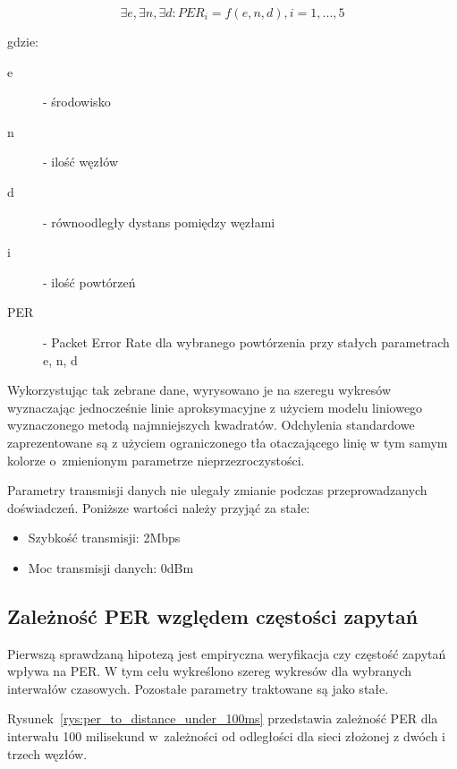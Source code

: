 \begin{equation}
\label{experiment_definition}
\exists e, \exists n, \exists d: PER_i = f(e, n, d), i=1,...,5
\end{equation}

gdzie:

\begin{description}
\item[e] - środowisko
\item[n] - ilość węzłów
\item[d] - równoodległy dystans pomiędzy węzłami
\item[i] - ilość powtórzeń
\item[PER] - Packet Error Rate dla wybranego powtórzenia przy stałych parametrach e, n, d
\end{description}

Wykorzystując tak zebrane dane, wyrysowano je na szeregu wykresów wyznaczając jednocześnie
linie aproksymacyjne z użyciem modelu liniowego wyznaczonego metodą najmniejszych kwadratów. Odchylenia standardowe zaprezentowane
są z użyciem ograniczonego tła otaczającego linię w tym samym kolorze o~zmienionym parametrze nieprzezroczystości.

Parametry transmisji danych nie ulegały zmianie podczas przeprowadzanych doświadczeń. Poniższe wartości należy
przyjąć za stałe:
\begin{itemize}
\item Szybkość transmisji: 2Mbps
\item Moc transmisji danych: 0dBm
\end{itemize}

\subsection{Zależność PER względem częstości zapytań}

Pierwszą sprawdzaną hipotezą jest empiryczna weryfikacja czy częstość zapytań wpływa na \gls{PER}.
W tym celu wykreślono szereg wykresów dla wybranych interwałów czasowych. Pozostałe parametry traktowane są
jako stałe.

Rysunek~\ref{rys:per_to_distance_under_100ms} przedstawia zależność PER dla interwału 100 milisekund w~zależności
od odległości dla sieci złożonej z dwóch i trzech węzłów. 


